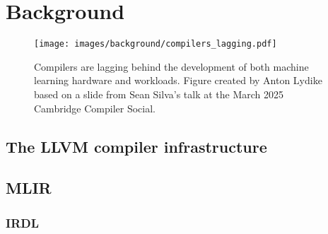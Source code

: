 \chapter{Background}
\label{chap:background}

%


\begin{figure}[H]
    \centering
    \texttt{[image: images/background/compilers\_lagging.pdf]}
    \caption{Compilers are lagging behind the development of both machine learning hardware and workloads. Figure created by Anton Lydike based on a slide from Sean Silva's talk at the March 2025 Cambridge Compiler Social.}
    \label{fig:compilers-lagging}
\end{figure}


\section{The LLVM compiler infrastructure}
\label{sec:llvm}





\section{MLIR}
\label{sec:mlir}

\subsection{IRDL}
\label{ssec:irdl}

